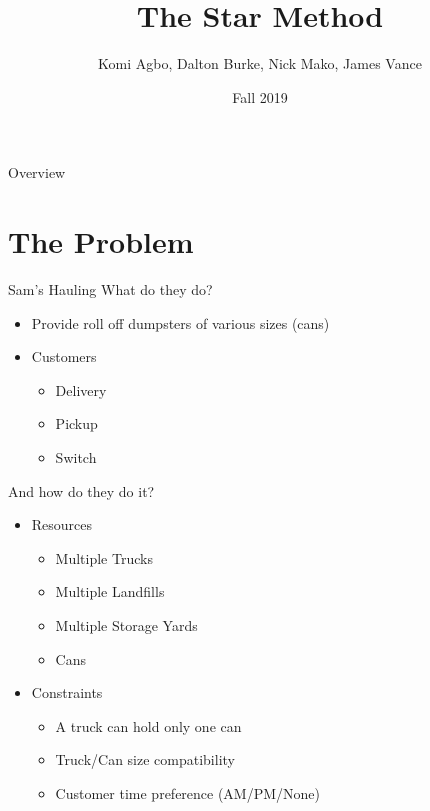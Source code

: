 \documentclass{beamer}
\title{The Star Method}
\author[Agbo, Burke, Mako, Vance]{Komi Agbo, Dalton Burke, Nick Mako, James Vance}
\institute[CU Denver]{University of Colorado Denver}
\date{Fall 2019}
\begin{document}
\maketitle

\begin{frame}{Overview}
	\begin{multicols}{2}
	\tableofcontents
	\end{multicols}
\end{frame}

\section{The Problem}
\begin{frame}{Sam's Hauling}
	What do they do?
	\begin{itemize}
		\item Provide roll off dumpsters of various sizes (cans)
		\item Customers 
		\begin{itemize}
			\item Delivery 
			\item Pickup 
			\item Switch 
		\end{itemize}
	\end{itemize}

	\pause
	And how do they do it?
	\begin{itemize}
		\item Resources
			\begin{itemize}
				\item Multiple Trucks
				\item Multiple Landfills
				\item Multiple Storage Yards
				\item Cans
			\end{itemize}
		\item Constraints
			\begin{itemize}
				\item A truck can hold only one can
				\item Truck/Can size compatibility
				\item Customer time preference (AM/PM/None)
			\end{itemize}
	\end{itemize}
\end{frame}
\end{document}
